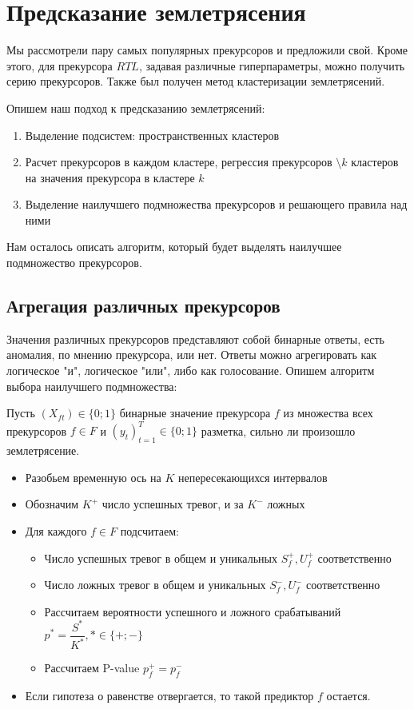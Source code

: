 \section{Предсказание землетрясения}
Мы рассмотрели пару самых популярных прекурсоров и предложили свой. Кроме этого, для прекурсора $RTL$, задавая различные гиперпараметры, можно получить серию прекурсоров. Также был получен метод кластеризации землетрясений.

Опишем наш подход к предсказанию землетрясений:

\begin{enumerate}
\item Выделение подсистем: пространственных кластеров
\item Расчет прекурсоров в каждом кластере, регрессия прекурсоров $\setminus k$ кластеров на значения прекурсора в кластере $k$
\item Выделение наилучшего подмножества прекурсоров и решающего правила над ними
\end{enumerate}

Нам осталось описать алгоритм, который будет выделять наилучшее подмножество прекурсоров.

\subsection{Агрегация различных прекурсоров}
Значения различных прекурсоров представляют собой бинарные ответы, есть аномалия, по мнению прекурсора, или нет. Ответы можно агрегировать как логическое "и", логическое "или", либо как голосование. Опишем алгоритм выбора наилучшего подмножества:

Пусть $(X_{ft}) \in \{0; 1\}$ бинарные значение прекурсора $f$ из множества всех прекурсоров $f\in F$ и $(y_t)_{t=1}^T \in \{0; 1\}$ разметка, сильно ли произошло землетрясение.
\begin{itemize}
\item Разобьем временную ось на $K$ непересекающихся интервалов
\item Обозначим $K^{+}$ число успешных тревог, и за $K^{-}$ ложных
\item Для каждого $f\in F$ подсчитаем:
\begin{itemize}
\item Число успешных тревог в общем и уникальных $S^{+}_{f}, U^{+}_{f}$ соответственно
\item Число ложных тревог в общем и уникальных $S^{-}_{f}, U^{-}_{f}$ соответственно
\item Рассчитаем вероятности успешного и ложного срабатываний $p^{*} = \dfrac{S^{*}}{K^{*}}, * \in \{+;-\}$
\item Рассчитаем P-value $p_{f}^{+} = p_{f}^{-}$
\end{itemize}
\item Если гипотеза о равенстве отвергается, то такой предиктор $f$ остается.
\end{itemize}

